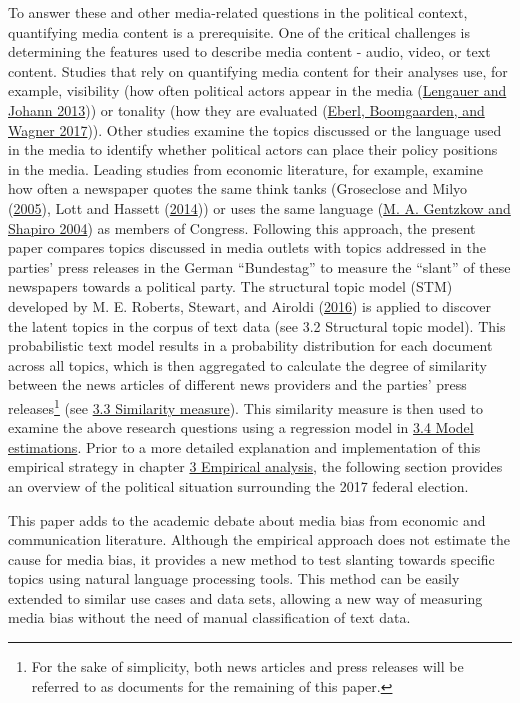 \documentclass[
  12pt,
]{article}
\begin{document}
To answer these and other media-related questions in the political
context, quantifying media content is a prerequisite. One of the
critical challenges is determining the features used to describe media
content - audio, video, or text content. Studies that rely on
quantifying media content for their analyses use, for example,
visibility (how often political actors appear in the media
(\protect\hyperlink{ref-lengauer_candidate_2013}{Lengauer and Johann
2013})) or tonality (how they are evaluated
(\protect\hyperlink{ref-eberl_one_2017}{Eberl, Boomgaarden, and Wagner
2017})). Other studies examine the topics discussed or the language used
in the media to identify whether political actors can place their policy
positions in the media. Leading studies from economic literature, for
example, examine how often a newspaper quotes the same think tanks
(Groseclose and Milyo
(\protect\hyperlink{ref-groseclose_measure_2005}{2005}), Lott and
Hassett (\protect\hyperlink{ref-lott_newspaper_2014}{2014})) or uses the
same language (\protect\hyperlink{ref-gentzkow_media_2004}{M. A.
Gentzkow and Shapiro 2004}) as members of Congress. Following this
approach, the present paper compares topics discussed in media outlets
with topics addressed in the parties' press releases in the German
``Bundestag'' to measure the ``slant'' of these newspapers towards a
political party. The structural topic model (STM) developed by M. E.
Roberts, Stewart, and Airoldi
(\protect\hyperlink{ref-roberts_model_2016}{2016}) is applied to
discover the latent topics in the corpus of text data (see
\protect\hypertarget{structural-topic-model}{}{3.2 Structural topic
model}). This probabilistic text model results in a probability
distribution for each document across all topics, which is then
aggregated to calculate the degree of similarity between the news
articles of different news providers and the parties' press
releases\footnote{For the sake of simplicity, both news articles and
  press releases will be referred to as documents for the remaining of
  this paper.} (see \protect\hyperlink{similarity-measure}{3.3
Similarity measure}). This similarity measure is then used to examine
the above research questions using a regression model in
\protect\hyperlink{model-estimations}{3.4 Model estimations}. Prior to a
more detailed explanation and implementation of this empirical strategy
in chapter \protect\hyperlink{empirical-analysis}{3 Empirical analysis},
the following section provides an overview of the political situation
surrounding the 2017 federal election.

This paper adds to the academic debate about media bias from economic
and communication literature. Although the empirical approach does not
estimate the cause for media bias, it provides a new method to test
slanting towards specific topics using natural language processing
tools. This method can be easily extended to similar use cases and data
sets, allowing a new way of measuring media bias without the need of
manual classification of text data.
\end{document}
